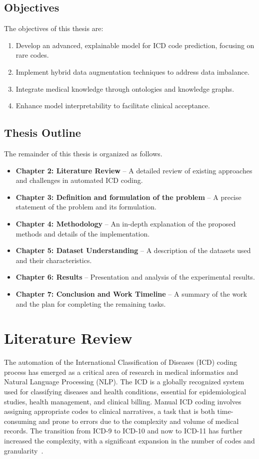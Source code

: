 \documentclass[12pt,a4paper]{report}
\begin{document}
\section{Objectives}
The objectives of this thesis are:
\begin{enumerate}
    \item Develop an advanced, explainable model for ICD code prediction, focusing on rare codes.
    \item Implement hybrid data augmentation techniques to address data imbalance.
    \item Integrate medical knowledge through ontologies and knowledge graphs.
    \item Enhance model interpretability to facilitate clinical acceptance.
\end{enumerate}

\section{Thesis Outline}
The remainder of this thesis is organized as follows.
\begin{itemize}
    \item \textbf{Chapter 2: Literature Review} – A detailed review of existing approaches and challenges in automated ICD coding.
    \item \textbf{Chapter 3: Definition and formulation of the problem} – A precise statement of the problem and its formulation.
    \item \textbf{Chapter 4: Methodology} – An in-depth explanation of the proposed methods and details of the implementation.
    \item \textbf{Chapter 5: Dataset Understanding} – A description of the datasets used and their characteristics.
    \item \textbf{Chapter 6: Results} – Presentation and analysis of the experimental results.
    \item \textbf{Chapter 7: Conclusion and Work Timeline} – A summary of the work and the plan for completing the remaining tasks.
\end{itemize}

\chapter{Literature Review}

The automation of the International Classification of Diseases (ICD) coding process has emerged as a critical area of research in medical informatics and Natural Language Processing (NLP). The ICD is a globally recognized system used for classifying diseases and health conditions, essential for epidemiological studies, health management, and clinical billing. Manual ICD coding involves assigning appropriate codes to clinical narratives, a task that is both time-consuming and prone to errors due to the complexity and volume of medical records. The transition from ICD-9 to ICD-10 and now to ICD-11 has further increased the complexity, with a significant expansion in the number of codes and granularity~\cite{who2019icd11}.
\end{document}
